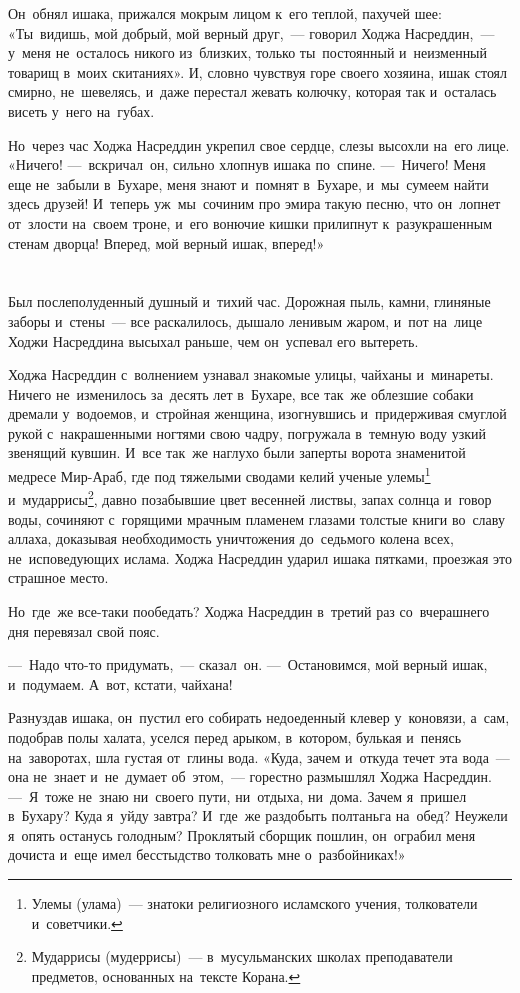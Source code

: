 \documentclass[12pt,a4paper]{book}
\begin{document}
Он~обнял ишака, прижался мокрым лицом к~его теплой, пахучей шее: «Ты~видишь, мой добрый, мой верный друг,~— говорил Ходжа Насреддин,~— у~меня не~осталось никого из~близких, только ты~постоянный и~неизменный товарищ в~моих скитаниях». И, словно чувствуя горе своего хозяина, ишак стоял смирно, не~шевелясь, и~даже перестал жевать колючку, которая так и~осталась висеть у~него на~губах.

Но~через час Ходжа Насреддин укрепил свое сердце, слезы высохли на~его лице. «Ничего! —~вскричал~он, сильно хлопнув ишака по~спине. —~Ничего! Меня еще не~забыли в~Бухаре, меня знают и~помнят в~Бухаре, и~мы~сумеем найти здесь друзей! И~теперь уж~мы~сочиним про эмира такую песню, что он~лопнет от~злости на~своем троне, и~его вонючие кишки прилипнут к~разукрашенным стенам дворца! Вперед, мой верный ишак, вперед!»


\chapter{}

Был послеполуденный душный и~тихий час. Дорожная пыль, камни, глиняные заборы и~стены~— все раскалилось, дышало ленивым жаром, и~пот на~лице Ходжи Насреддина высыхал раньше, чем он~успевал его вытереть.

Ходжа Насреддин с~волнением узнавал знакомые улицы, чайханы и~минареты. Ничего не~изменилось за~десять лет в~Бухаре, все так~же облезшие собаки дремали у~водоемов, и~стройная женщина, изогнувшись и~придерживая смуглой рукой с~накрашенными ногтями свою чадру, погружала в~темную воду узкий звенящий кувшин. И~все так~же наглухо были заперты ворота знаменитой медресе Мир-Араб, где под тяжелыми сводами келий ученые улемы\footnote{Улемы (улама)~— знатоки религиозного исламского учения, толкователи и~советчики.} и~мударрисы\footnote{Мударрисы (мудеррисы)~— в~мусульманских школах преподаватели предметов, основанных на~тексте Корана.}, давно позабывшие цвет весенней листвы, запах солнца и~говор воды, сочиняют с~горящими мрачным пламенем глазами толстые книги во~славу аллаха, доказывая необходимость уничтожения до~седьмого колена всех, не~исповедующих ислама. Ходжа Насреддин ударил ишака пятками, проезжая это страшное место.

Но~где~же все-таки пообедать? Ходжа Насреддин в~третий раз со~вчерашнего дня перевязал свой пояс.

—~Надо что-то придумать,~— сказал~он. —~Остановимся, мой верный ишак, и~подумаем. А~вот, кстати, чайхана!

Разнуздав ишака, он~пустил его собирать недоеденный клевер у~коновязи, а~сам, подобрав полы халата, уселся перед арыком, в~котором, булькая и~пенясь на~заворотах, шла густая от~глины вода. «Куда, зачем и~откуда течет эта вода~— она не~знает и~не~думает об~этом,~— горестно размышлял Ходжа Насреддин. —~Я~тоже не~знаю ни~своего пути, ни~отдыха, ни~дома. Зачем я~пришел в~Бухару? Куда я~уйду завтра? И~где~же раздобыть полтаньга на~обед? Неужели я~опять останусь голодным? Проклятый сборщик пошлин, он~ограбил меня дочиста и~еще имел бесстыдство толковать мне о~разбойниках!»
\end{document}
